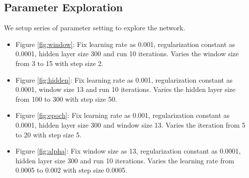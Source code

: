 \documentclass[letterpaper]{article}
\begin{document}
\subsection{Parameter Exploration}
We setup series of parameter setting to explore the network.
\begin{itemize}
\item Figure \ref{fig:window}: Fix learning rate as 0.001, regularization constant as 0.0001, hidden layer size 300 and run 10 iterations. Varies the window size from 3 to 15 with step size 2.
\item Figure \ref{fig:hidden}: Fix learning rate as 0.001, regularization constant as 0.0001, window size 13 and run 10 iterations. Varies the hidden layer size from 100 to 300 with step size 50.
\item Figure \ref{fig:epoch}: Fix learning rate as 0.001, regularization constant as 0.0001, hidden layer size 300 and window size 13. Varies the iteration from 5 to 20 with step size 5.
\item Figure \ref{fig:alpha}: Fix window size as 13, regularization constant as 0.0001, hidden layer size 300 and run 10 iterations. Varies the learning rate from 0.0005 to 0.002 with step size 0.0005.
\end{itemize}
\end{document}
